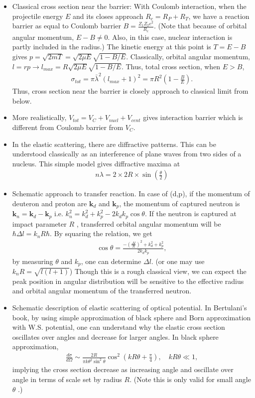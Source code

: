 \documentclass[11pt]{book}
\def\bm{\boldsymbol}
\def\vk{{\bm k}}
\newcommand{\bea}{\begin{eqnarray}}
\newcommand{\eea}{\end{eqnarray}}
\begin{document}
\begin{itemize}
	  \item Classical cross section near the barrier: 
	       With Coulomb interaction, when the projectile energy $E$ and its closes approach $R_c=R_P+R_T$,
	       we have a reaction barrier as equal to Coulomb barrier 
	       $B=\frac{Z_1 Z_2 e^2}{R_c}$. (Note that because of orbital angular momentum,
	       $E-B\neq 0$. Also, in this case, nuclear interaction is partly included in the radius.) 
	       The kinetic energy at this point is $T=E-B$ gives $p=\sqrt{2mT}=\sqrt{2\mu E}\sqrt{1-B/E}$.
	       Classically, orbital angular momentum, $l= r p \to l_{max}=R\sqrt{2\mu E}\sqrt{1-B/E}$. 
	       Thus, total cross section, when $E>B$,
	       \bea 
	       \sigma_{tot}=\pi{\bar\lambda}^2 (l_{max}+1)^2= \pi R^2(1-\frac{B}{E}). 
	       \eea 
	       Thus, cross section near the barrier is closely approach to classical limit from below. 
	  \item More realistically, $V_{tot}=V_C+V_{nucl}+V_{cent}$ gives interaction barrier
	        which is different from Coulomb barrier from $V_C$.      
	  \item In the elastic scattering, there are diffractive patterns. This can be understood classically 
	        as an interference of plane waves from two sides of a nucleus.        
	        This simple model gives diffractive maxima at 
	        \bea 
	        n\lambda = 2\times 2R\times \sin(\frac{\theta}{2})
	        \eea
	   \item Schematic approach to transfer reaction. 
	        In case of (d,p), if the momentum of deuteron and proton are $\vk_d$ and $\vk_p$, 
	        the momentum of captured neutron is $\vk_n=\vk_d-\vk_p$ i.e. $k_n^2=k_d^2+k_p^2-2k_d k_p\cos\theta$. 
	        If the neutron is captured at impact parameter $R$ , transferred orbital angular momentum will be
	        $\hbar\Delta l = k_n R\hbar$. By squaring the relation, we get 
	        \bea 
	        \cos\theta= \frac{ -(\frac{\Delta l}{R} )^2+k_d^2+k_p^2}{2 k_d k_p},
	        \eea 
	        by measuring $\theta$ and $k_p$, one can determine $\Delta l$. (or one may use $k_n R= \sqrt{l (l+1)}$) 
	        Though this is a rough classical view, we can expect the peak position in 
	        angular distribution will be sensitive to the effective radius and orbital angular momentum 
	        of the transferred neutron.   
	  \item Schematic description of elastic scattering of optical potential. 
	        In Bertulani's book, by using simple approximation of 
	        black sphere and Born approximation with W.S. potential, 
	        one can understand why the elastic cross section oscillates 
	        over angles and decrease for larger angles. 
	        In black sphere approximation, 
	        \bea 
	        \frac{d\sigma}{d\Omega}\sim \frac{2R}{\pi k\theta^2\sin^2\theta}\cos^2(k R\theta+\frac{\pi}{4}), \quad k R\theta \ll 1,
	        \eea 
	        implying the cross section decrease as increasing angle and oscillate
	        over angle in terms of scale set by radius $R$. 
	        (Note this is only valid for small angle $\theta$ .)
	        

\end{itemize}
\end{document}
